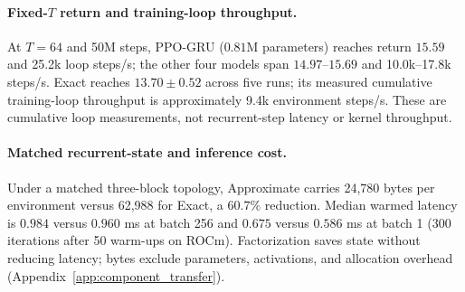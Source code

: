 \paragraph{Fixed-$T$ return and training-loop throughput.}
At $T=64$ and 50M steps, PPO-GRU ($0.81$M parameters) reaches return $15.59$ and 25.2k loop steps/s; the other four models span $14.97$--$15.69$ and 10.0k--17.8k steps/s. Exact reaches $13.70\pm0.52$ across five runs; its measured cumulative training-loop throughput is approximately 9.4k environment steps/s. These are cumulative loop measurements, not recurrent-step latency or kernel throughput.

\paragraph{Matched recurrent-state and inference cost.}
Under a matched three-block topology, Approximate carries 24,780 bytes per environment versus 62,988 for Exact, a $60.7\%$ reduction. Median warmed latency is $0.984$ versus $0.960$ ms at batch 256 and $0.675$ versus $0.586$ ms at batch 1 (300 iterations after 50 warm-ups on ROCm). Factorization saves state without reducing latency; bytes exclude parameters, activations, and allocation overhead (Appendix~\ref{app:component_transfer}).
